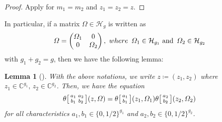 \documentclass{amsart}
\theoremstyle{definition}
\theoremstyle{plain}
\newtheorem{Lem}[Def]{Lemma}
\begin{document}
\begin{proof}
Apply \cite[Chapter\,IV, Theorem 2]{Igusa} for $m_1 = m_2$ and $z_1 = z_2 = z$.
\end{proof}\smallskip

In particular, if a matrix $\varOmega \in \mathcal{H}_g$ is written as
\[
    \varOmega = \begin{pmatrix}
    \varOmega_1 & 0\\
    0 & \varOmega_2
    \end{pmatrix},\ {\rm where}\ \,\varOmega_1 \in \mathcal{H}_{g_1} \text{ and }\, \varOmega_2 \in \mathcal{H}_{g_2}
\]
with $g_1 + g_2 = g$, then we have the following lemma:
\begin{Lem}[{\cite[Lemma F.3.1]{SQIsignHD}}]\label{diagonal}
With the above notations, we write $z \coloneqq (z_1,z_2)$ where $z_1 \in \mathbb{C}^{g_1},\,z_2 \in \mathbb{C}^{g_2}$. Then, we have the equation\vspace{0.5mm}
\[
    \theta\bigl[\begin{smallmatrix}a_1 & a_2\\b_1 & b_2\end{smallmatrix}\bigr](z,\varOmega) = \theta\bigl[\begin{smallmatrix}a_1\\b_1\end{smallmatrix}\bigr](z_1,\varOmega_1)\theta\bigl[\begin{smallmatrix}a_2\\b_2 \end{smallmatrix}\bigr](z_2,\varOmega_2)\medskip
\]
for all characteristics $a_1,b_1 \in \{0,1/2\}^{g_1}\!$ and $a_2,b_2 \in \{0,1/2\}^{g_2}$.
\end{Lem}
\end{document}
